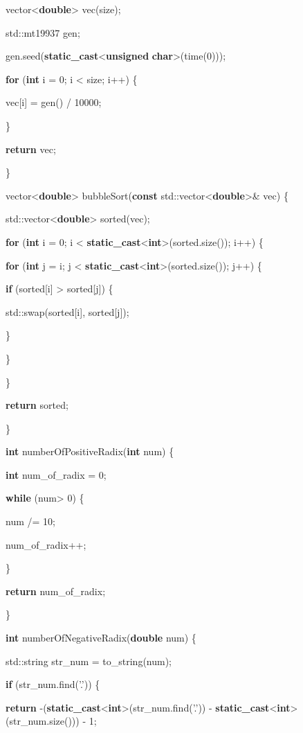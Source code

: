 \documentclass[]{article}
\begin{document}
vector\textless{}\textbf{double}\textgreater{} vec(size);

std::mt19937 gen;

gen.seed(\textbf{static\_cast}\textless{}\textbf{unsigned}
\textbf{char}\textgreater{}(time(0)));

\textbf{for} (\textbf{int} i = 0; i \textless{} size; i++) \{

vec{[}i{]} = gen() / 10000;

\}

\textbf{return} vec;

\}

vector\textless{}\textbf{double}\textgreater{} bubbleSort(\textbf{const}
std::vector\textless{}\textbf{double}\textgreater{}\& vec) \{

std::vector\textless{}\textbf{double}\textgreater{} sorted(vec);

\textbf{for} (\textbf{int} i = 0; i \textless{}
\textbf{static\_cast}\textless{}\textbf{int}\textgreater{}(sorted.size());
i++) \{

\textbf{for} (\textbf{int} j = i; j \textless{}
\textbf{static\_cast}\textless{}\textbf{int}\textgreater{}(sorted.size());
j++) \{

\textbf{if} (sorted{[}i{]} \textgreater{} sorted{[}j{]}) \{

std::swap(sorted{[}i{]}, sorted{[}j{]});

\}

\}

\}

\textbf{return} sorted;

\}

\textbf{int} numberOfPositiveRadix(\textbf{int} num) \{

\textbf{int} num\_of\_radix = 0;

\textbf{while} (num\textgreater{} 0) \{

num /= 10;

num\_of\_radix++;

\}

\textbf{return} num\_of\_radix;

\}

\textbf{int} numberOfNegativeRadix(\textbf{double} num) \{

std::string str\_num = to\_string(num);

\textbf{if} (str\_num.find('.')) \{

\textbf{return}
-(\textbf{static\_cast}\textless{}\textbf{int}\textgreater{}(str\_num.find('.'))
-
\textbf{static\_cast}\textless{}\textbf{int}\textgreater{}(str\_num.size()))
- 1;
\end{document}
